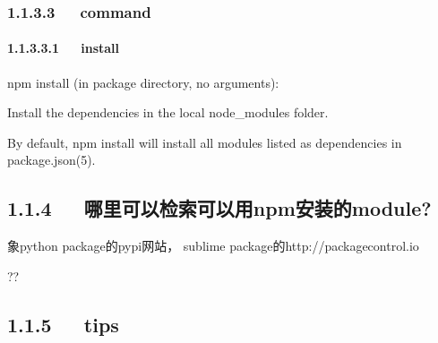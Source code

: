 \documentclass[letterpaper,12pt,english]{sphinxmanual}
\begin{document}
\subsubsection{1.1.3.3   command}
\label{\detokenize{001software/001install/001._u7f51_u7ad9/nodeJs:command}}

\paragraph{1.1.3.3.1   install}
\label{\detokenize{001software/001install/001._u7f51_u7ad9/nodeJs:id4}}
npm install (in package directory, no arguments):

Install the dependencies in the local node\_modules folder.

By default, npm install will install all modules listed as dependencies in package.json(5).


\subsection{1.1.4   哪里可以检索可以用npm安装的module?}
\label{\detokenize{001software/001install/001._u7f51_u7ad9/nodeJs:npmmodule}}
象python package的pypi网站， sublime package的http://packagecontrol.io

??


\subsection{1.1.5   tips}
\label{\detokenize{001software/001install/001._u7f51_u7ad9/nodeJs:tips}}
\end{document}

